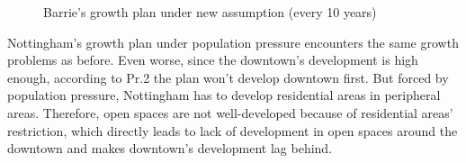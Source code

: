 \begin{figure}[htb]
  \label{fig:barrie-amend-diff}
  \centering
  \caption{Barrie's growth plan under new assumption (every 10 years)}
\end{figure}

Nottingham's growth plan under population pressure encounters the same growth problems as before. Even worse, since the downtown's development is high enough, according to Pr.2 the plan won't develop downtown first. But forced by population pressure, Nottingham has to develop residential areas in peripheral areas. Therefore, open spaces are not well-developed because of residential areas' restriction, which directly leads to lack of development in open spaces around the downtown and makes downtown's development lag behind.\\

